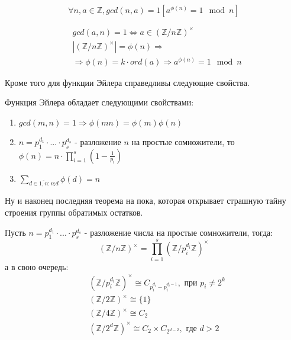 \begin{Th}
\[
	\forall n,a \in \mathbb{Z}, gcd\left(n,a\right) = 1 \left[a^{\phi\left(n\right)} = 1 \mod n\right]
\]
\end{Th}

\begin{Proof}
\[
	\begin{split}
		& gcd\left(a,n\right) = 1 \Leftrightarrow a \in \left(\mathbb{Z} / {n \mathbb{Z}}\right)^{\times} \\
		& \left|\left(\mathbb{Z}/{n \mathbb{Z}}\right)^{\times}\right| = \phi\left(n\right) \Rightarrow \\
		& \Rightarrow \phi\left(n\right) = k \cdot ord\left(a\right) \Rightarrow a^{\phi\left(n\right)} = 1 \mod n
	\end{split}
\]
\end{Proof}

Кроме того для функции Эйлера справедливы следующие свойства.

\begin{Th}
Функция Эйлера обладает следующими свойствами:
\begin{enumerate}
\item $gcd\left(m,n\right) = 1 \Rightarrow \phi\left(mn\right) = \phi\left(m\right)\phi\left(n\right)$

\item $n = p_1^{d_1} \cdot ... \cdot p_s^{d_s}$ - разложение $n$ на простые сомножители, то $\phi\left(n\right) = n \cdot \prod_{i = 1}^{s} \left(1 - \frac{1}{p_i}\right)$

\item $\sum_{d \in \overline{1,n} : n \vdots d}\phi\left(d\right) = n$
\end{enumerate}
\end{Th}

Ну и наконец последняя теорема на пока, которая открывает страшную тайну строения группы обратимых остатков.

\begin{Th}
Пусть $n = p_1^{d_1} \cdot ... \cdot p_s^{d_s}$ - разложение числа на простые сомножители, тогда:
\[
	\left(\mathbb{Z} / {n \mathbb{Z}}\right)^{\times} = \prod_{i=1}^{s} \left(\mathbb{Z} / {p_i^{d_i} \mathbb{Z}}\right)^{\times}
\]
а в свою очередь:
\[
	\begin{split}
		& \left(\mathbb{Z}/{p_i^{d_i} \mathbb{Z}}\right)^{\times} \cong C_{p_i^{d_i} - p_i^{d_i - 1}}, \text{ при } p_i \not= 2^k \\
		& \left(\mathbb{Z}/{2\mathbb{Z}}\right)^{\times} \cong \{1\} \\
		& \left(\mathbb{Z}/{4\mathbb{Z}}\right)^{\times} \cong C_2 \\
		& \left(\mathbb{Z}/{2^d\mathbb{Z}}\right)^{\times} \cong C_2 \times C_{2^{d-2}}, \text{ где } d > 2
	\end{split}
\]
\end{Th}
